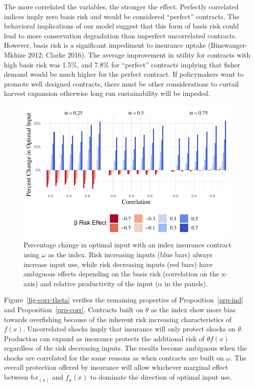 \documentclass[
  letterpaper,
  DIV=11,
  numbers=noendperiod]{scrartcl}
\theoremstyle{plain}
\theoremstyle{plain}
\theoremstyle{remark}
\begin{document}
The more correlated the variables, the stronger the effect. Perfectly
correlated indices imply zero basis risk and would be considered
``perfect'' contracts. The behavioral implications of our model suggest
that this form of basis risk could lead to more conservation degradation
than imperfect uncorrelated contracts. However, basis risk is a
significant impediment to insurance uptake (Binswanger-Mkhize 2012;
Clarke 2016). The average improvement in utility for contracts with high
basis risk was 1.5\%, and 7.8\% for ``perfect'' contracts implying that
fisher demand would be much higher for the perfect contract. If
policymakers want to promote well designed contracts, there must be
other considerations to curtail harvest expansion otherwise long run
sustainability will be impeded.

\begin{figure}

{\centering \includegraphics{ibi-behavior_files/figure-pdf/fig-corr-1.pdf}

}

\caption{\label{fig-corr}Percentage change in optimal input with an
index insurance contract using \(\omega\) as the index. Risk increasing
inputs (blue bars) always increase input use, while risk decreasing
inputs (red bars) have ambiguous effects depending on the basis risk
(correlation on the x-axis) and relative productivity of the input
(\(\alpha\) in the panels).}

\end{figure}

Figure~\ref{fig-corr-theta} verifies the remaining properties of
Proposition~\ref{prp-ind} and Proposition~\ref{prp-corr}. Contracts
built on \(\theta\) as the index show more bias towards overfishing
because of the inherent risk increasing characteristics of \(f(x)\).
Uncorrelated shocks imply that insurance will only protect shocks on
\(\theta\). Production can expand as insurance protects the additional
risk of \(\theta f(x)\) regardless of the risk decreasing inputs. The
results become ambiguous when the shocks are correlated for the same
reasons as when contracts are built on \(\omega\). The overall
protection offered by insurance will allow whichever marginal effect
between \(hx_(x)\) and \(f_x(x)\) to dominate the direction of optimal
input use.
\end{document}
